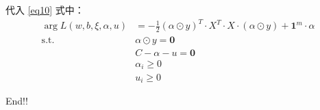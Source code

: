 \documentclass[12pt, a4paper, oneside]{ctexart}
\begin{document}
代入 \eqref{eq10} 式中： 
\begin{align}
    \mathop{\arg\max_{\alpha}}  L(w, b, \xi, {\alpha}, u) &= -\frac{1}{2}(\alpha \odot y)^T \cdot X^T \cdot X \cdot (\alpha \odot y) + \boldsymbol{1}^m \cdot \alpha \label{eq11} \\
    \mathrm{ s.t. }\ \   &\alpha \odot y = \boldsymbol{0} \nonumber \\
    &C - \alpha - u \nonumber  = \boldsymbol{0} \nonumber \\
    &\alpha_i \geq 0 \nonumber \\
    &u_i \geq 0 \nonumber 
\end{align}

End!!
\end{document}
